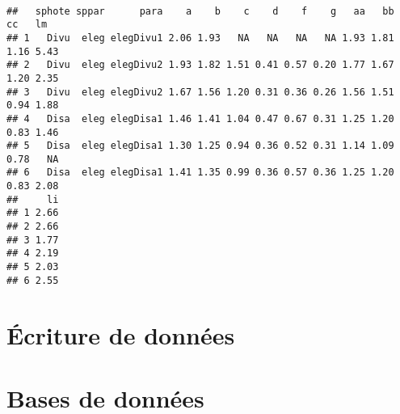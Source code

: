 \begin{knitrout}
\color{fgcolor}\begin{kframe}
\begin{flushleft}
\ttfamily\noindent
{}\hlassignement{\usebox{\hlnormalsizeboxlessthan}-}{\ }\hlkeyword{(}\hlkeyword{,}{\ }\hlargument{=}{\ }\hlkeyword{,}{\ }\hlargument{=}{\ }\hlkeyword{)}\hspace*{\fill}\\
\hlstd{}\hlkeyword{(}\hlkeyword{)}\mbox{}
\normalfont
\end{flushleft}
\begin{verbatim}
##   sphote sppar      para    a    b    c    d    f    g   aa   bb   cc   lm
## 1   Divu  eleg elegDivu1 2.06 1.93   NA   NA   NA   NA 1.93 1.81 1.16 5.43
## 2   Divu  eleg elegDivu2 1.93 1.82 1.51 0.41 0.57 0.20 1.77 1.67 1.20 2.35
## 3   Divu  eleg elegDivu2 1.67 1.56 1.20 0.31 0.36 0.26 1.56 1.51 0.94 1.88
## 4   Disa  eleg elegDisa1 1.46 1.41 1.04 0.47 0.67 0.31 1.25 1.20 0.83 1.46
## 5   Disa  eleg elegDisa1 1.30 1.25 0.94 0.36 0.52 0.31 1.14 1.09 0.78   NA
## 6   Disa  eleg elegDisa1 1.41 1.35 0.99 0.36 0.57 0.36 1.25 1.20 0.83 2.08
##     li
## 1 2.66
## 2 2.66
## 3 1.77
## 4 2.19
## 5 2.03
## 6 2.55
\end{verbatim}
\end{kframe}
\end{knitrout}


\section{Écriture de données}



\section{Bases de données}

